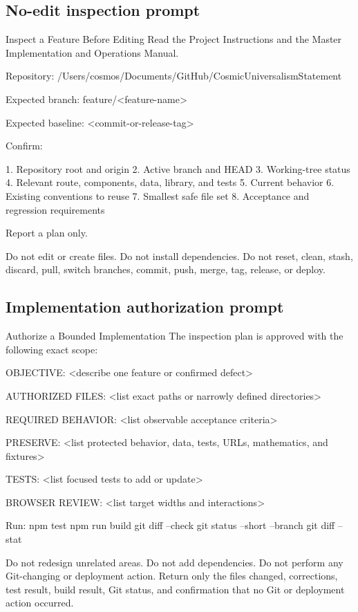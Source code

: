 \documentclass[11pt,letterpaper]{article}
\begin{document}
\subsection{No-edit inspection prompt}

\begin{promptbox}{Inspect a Feature Before Editing}
Read the Project Instructions and the Master Implementation and
Operations Manual.

Repository:
/Users/cosmos/Documents/GitHub/CosmicUniversalismStatement

Expected branch:
feature/<feature-name>

Expected baseline:
<commit-or-release-tag>

Confirm:

1. Repository root and origin
2. Active branch and HEAD
3. Working-tree status
4. Relevant route, components, data, library, and tests
5. Current behavior
6. Existing conventions to reuse
7. Smallest safe file set
8. Acceptance and regression requirements

Report a plan only.

Do not edit or create files.
Do not install dependencies.
Do not reset, clean, stash, discard, pull, switch branches, commit,
push, merge, tag, release, or deploy.
\end{promptbox}

\subsection{Implementation authorization prompt}

\begin{promptbox}{Authorize a Bounded Implementation}
The inspection plan is approved with the following exact scope:

OBJECTIVE:
<describe one feature or confirmed defect>

AUTHORIZED FILES:
<list exact paths or narrowly defined directories>

REQUIRED BEHAVIOR:
<list observable acceptance criteria>

PRESERVE:
<list protected behavior, data, tests, URLs, mathematics, and fixtures>

TESTS:
<list focused tests to add or update>

BROWSER REVIEW:
<list target widths and interactions>

Run:
npm test
npm run build
git diff --check
git status --short --branch
git diff --stat

Do not redesign unrelated areas.
Do not add dependencies.
Do not perform any Git-changing or deployment action.
Return only the files changed, corrections, test result, build result,
Git status, and confirmation that no Git or deployment action occurred.
\end{promptbox}
\end{document}
